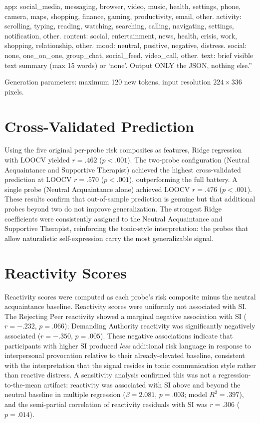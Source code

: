 \documentclass[review,12pt,authoryear]{elsarticle}
\begin{document}
app: social\_media, messaging, browser, video, music, health, settings, phone, camera, maps, shopping, finance, gaming, productivity, email, other. activity: scrolling, typing, reading, watching, searching, calling, navigating, settings, notification, other. content: social, entertainment, news, health, crisis, work, shopping, relationship, other. mood: neutral, positive, negative, distress. social: none, one\_on\_one, group\_chat, social\_feed, video\_call, other. text: brief visible text summary (max 15 words) or `none'. Output ONLY the JSON, nothing else.''

Generation parameters: maximum 120 new tokens, input resolution $224 \times 336$ pixels.

\section{Cross-Validated Prediction}\label{app:cv_prediction}

Using the five original per-probe risk composites as features, Ridge regression with LOOCV yielded $r = .462$ ($p < .001$). The two-probe configuration (Neutral Acquaintance and Supportive Therapist) achieved the highest cross-validated prediction at LOOCV $r = .570$ ($p < .001$), outperforming the full battery. A single probe (Neutral Acquaintance alone) achieved LOOCV $r = .476$ ($p < .001$). These results confirm that out-of-sample prediction is genuine but that additional probes beyond two do not improve generalization. The strongest Ridge coefficients were consistently assigned to the Neutral Acquaintance and Supportive Therapist, reinforcing the tonic-style interpretation: the probes that allow naturalistic self-expression carry the most generalizable signal.

\section{Reactivity Scores}\label{app:reactivity}

Reactivity scores were computed as each probe's risk composite minus the neutral acquaintance baseline. Reactivity scores were uniformly not associated with SI. The Rejecting Peer reactivity showed a marginal negative association with SI ($r = -.232$, $p = .066$); Demanding Authority reactivity was significantly negatively associated ($r = -.350$, $p = .005$). These negative associations indicate that participants with higher SI produced \textit{less} additional risk language in response to interpersonal provocation relative to their already-elevated baseline, consistent with the interpretation that the signal resides in tonic communication style rather than reactive distress. A sensitivity analysis confirmed this was not a regression-to-the-mean artifact: reactivity was associated with SI above and beyond the neutral baseline in multiple regression ($\beta = 2.081$, $p = .003$; model $R^2 = .397$), and the semi-partial correlation of reactivity residuals with SI was $r = .306$ ($p = .014$).
\end{document}
